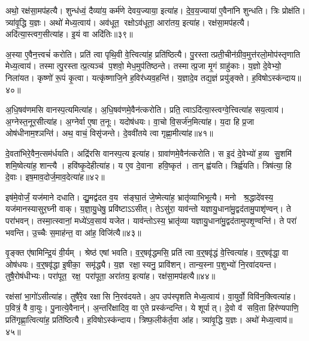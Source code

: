 अथो॒ रक्ष॑सा॒मप॑हत्यै।
शुन्ध॑ध्वं॒ दैव्या॑य॒ कर्म॑णे देवय॒ज्याया॒ इत्या॑ह।
दे॒व॒य॒ज्याया॑ ए॒वैना॑नि शुन्धति।
त्रिः प्रोक्ष॑ति।
त्र्या॑वृ॒द्धि य॒ज्ञः।
अथो॑ मेध्य॒त्वाय॑।
अव॑धूत॒ रक्षोऽव॑धूता॒ आरा॑तय॒ इत्या॑ह।
रक्ष॑सा॒मप॑हत्यै।
अदि॑त्या॒स्त्वग॒सीत्या॑ह।
इ॒यं वा अदि॑तिः॥३९॥

अ॒स्या ए॒वैन॒त्त्वचं॑ करोति।
प्रति॑ त्वा पृथि॒वी वे॒त्त्वित्या॑ह॒ प्रति॑ष्ठित्यै।
पु॒रस्तात्प्रती॒चीन॑ग्रीव॒मुत्त॑रलो॒मोप॑स्तृणाति मेध्य॒त्वाय॑।
तस्मात्पु॒रस्तात्प्र॒त्यञ्च॑ प॒शवो॒ मेध॒मुप॑तिष्ठन्ते।
तस्मात्प्र॒जा मृ॒गं ग्राहु॑काः।
य॒ज्ञो दे॒वेभ्यो॒ निला॑यत।
कृष्णो॑ रू॒पं कृ॒त्वा।
यत्कृ॑ष्णाजि॒ने ह॒विर॑ध्यव॒हन्ति॑।
य॒ज्ञादे॒व तद्य॒ज्ञं प्रयु॑ङ्क्ते।
ह॒विषोऽस्क॑न्दाय॥४०॥

अ॒धि॒षव॑णमसि वानस्प॒त्यमित्या॑ह।
अ॒धि॒षव॑णमे॒वैन॑त्करोति।
प्रति॒ त्वाऽदि॑त्या॒स्त्वग्वे॒त्त्वित्या॑ह सय॒त्वाय॑।
अ॒ग्नेस्त॒नूर॒सीत्या॑ह।
अ॒ग्नेर्वा ए॒षा त॒नूः।
यदोष॑धयः।
वा॒चो वि॒सर्ज॑न॒मित्या॑ह।
य॒दा हि प्र॒जा ओष॑धीनाम॒श्ञन्ति॑।
अथ॒ वाचं॒ विसृ॑जन्ते।
दे॒ववी॑तये त्वा गृह्णा॒मीत्या॑ह॥४१॥

दे॒वता॑भिरे॒वैन॒त्सम॑र्धयति।
अद्रि॑रसि वानस्प॒त्य इत्या॑ह।
ग्रावा॑णमे॒वैन॑त्करोति।
स इ॒दं दे॒वेभ्यो॑ ह॒व्य सु॒शमि॑ शमि॒ष्वेत्या॑ह॒ शान्त्यै।
हवि॑ष्कृ॒देहीत्या॑ह।
य ए॒व दे॒वाना हवि॒ष्कृत॑।
तान्‌ ह्व॑यति।
त्रिर्ह्व॑यति।
त्रिष॑त्या॒ हि दे॒वाः।
इष॒माव॒दोर्ज॒माव॒देत्या॑ह॥४२॥

इष॑मे॒वोर्जं॒ यज॑माने दधाति।
द्यु॒मद्व॑दत व॒य स॑ङ्घा॒तं जे॒ष्मेत्या॑ह॒ भ्रातृ॑व्याभिभूत्यै।
मनो श्र॒द्धादे॑वस्य॒ यज॑मानस्यासुर॒घ्नी वाक्।
य॒ज्ञा॒यु॒धेषु॒ प्रवि॑ष्टाऽऽसीत्।
तेऽसु॑रा॒ याव॑न्तो यज्ञायु॒धाना॑मु॒द्वद॑तामु॒पाशृ॑ण्वन्।
ते परा॑भवन्।
तस्मा॒त्स्वानां॒ मध्ये॑ऽव॒साय॑ यजेत।
याव॑न्तोऽस्य॒ भ्रातृ॑व्या यज्ञायु॒धाना॑मु॒द्वद॑तामुपशृ॒ण्वन्ति॑।
ते परा॑ भवन्ति।
उ॒च्चैः स॒माह॑न्त॒ वा आ॑ह॒ विजि॑त्यै॥४३॥

वृ॒ङ्क्त ए॑षामिन्द्रि॒यं वी॒र्यम्।
श्रेष्ठ॑ एषां भवति।
व॒र्\mbox{}॒षवृ॑द्धमसि॒ प्रति॑ त्वा व॒र्\mbox{}॒षवृ॑द्धं वे॒त्त्वित्या॑ह।
व॒र्\mbox{}॒षवृ॑द्धा॒ वा ओष॑धयः।
व॒र्\mbox{}॒षवृ॑द्धा इ॒षीका॒ समृ॑द्ध्यै।
य॒ज्ञ रक्षा॒स्यनु॒ प्रावि॑शन्।
तान्य॒स्ना प॒शुभ्यो॑ नि॒रवा॑दयन्त।
तुषै॒रोष॑धीभ्यः।
परा॑पूत॒ रक्ष॒ परा॑पूता॒ अरा॑तय॒ इत्या॑ह।
रक्ष॑सा॒मप॑हत्यै॥४४॥

रक्ष॑सां भा॒गो॑ऽसीत्या॑ह।
तुषै॑रे॒व रक्षासि नि॒रव॑दयते।
अ॒प उप॑स्पृशति मेध्य॒त्वाय॑।
वा॒युर्वो॒ विवि॑न॒क्त्वित्या॑ह।
प॒वित्रं॒ वै वा॒युः।
पु॒नात्ये॒वैनान्॑।
अ॒न्तरि॑क्षादिव॒ वा ए॒ते प्रस्क॑न्दन्ति।
ये शूर्पात्।
दे॒वो व॑ सवि॒ता हिर॑ण्यपाणि॒ प्रति॑गृह्णा॒त्वित्या॑ह॒ प्रति॑ष्ठित्यै।
ह॒विषोऽस्क॑न्दाय।
त्रिष्फ॒लीक॑र्त॒वा आ॑ह।
त्र्या॑वृ॒द्धि य॒ज्ञः।
अथो॑ मेध्य॒त्वाय॑॥४५॥\anuvakamend[द्वाभ्या॒मुत्पु॑नाति र॒श्मयो॑ नय॒न्त्यग्रे॑ य॒ज्ञप॑तिं य॒ज्ञोऽदि॑ति॒रस्क॑न्दाय गृह्णा॒मीत्या॑ह व॒देत्या॑ह॒ विजि॑त्या॒ अप॑हत्या॒ अस्क॑न्दाय॒ त्रीणि॑ च]

